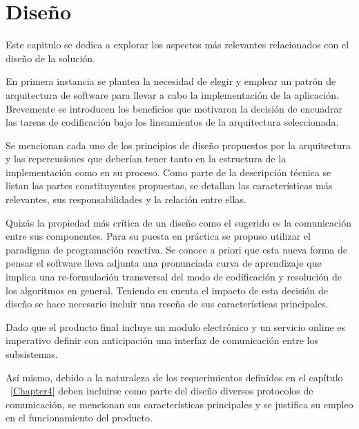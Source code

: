 
\chapter{Diseño} %

\label{Chapter5} %

Este capitulo se dedica a explorar los aspectos más relevantes relacionados con el diseño de la solución.

En primera instancia se plantea la necesidad de elegir y emplear un patrón de arquitectura de software 
para llevar a cabo la implementación de la aplicación. Brevemente se introducen los beneficios que motivaron la decisión de 
encuadrar las tareas de codificación bajo los lineamientos de la arquitectura seleccionada.

Se mencionan cada uno de los principios de diseño propuestos por la arquitectura y las repercusiones que deberían tener tanto en la estructura de la implementación como en su proceso.
Como parte de la descripción técnica se listan las partes constituyentes propuestas, se detallan las características más relevantes, sus responsabilidades y la relación entre ellas.

Quizás la propiedad más crítica de un diseño como el sugerido es la comunicación entre sus componentes.
Para su puesta en práctica se propuso utilizar el paradigma de programación reactiva. Se conoce a priori que esta nueva forma de pensar el software lleva adjunta una pronunciada curva de aprendizaje que implica una re-formulación
transversal del modo de codificación y resolución de los algoritmos en general. 
Teniendo en cuenta el impacto de esta decisión de diseño se hace necesario incluir una reseña de sus características principales.

Dado que el producto final incluye un modulo electrónico y un servicio online es imperativo definir con anticipación una interfaz de comunicación entre los subsistemas.

Así mismo, debido a la naturaleza de los requerimientos definidos en el capítulo ~\ref{Chapter4} deben incluirse como parte del diseño diversos protocolos de comunicación, se mencionan sus características principales y se justifica su empleo en el funcionamiento del producto.

